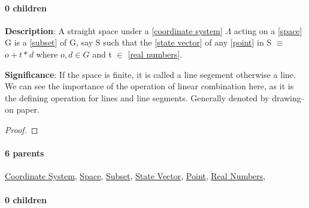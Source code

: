\documentclass[../main.tex]{subfiles}
\begin{document}
\paragraph{0 children} 



\begin{statement}
\label{statement:Straight Space}\hspace*{0pt}\par
\end{statement}
\textbf{Description}:
A straight space under a [\hyperref[statement:Coordinate System]{coordinate system}] $\Lambda$ acting on a [\hyperref[statement:Space]{space}] G is a [\hyperref[statement:Subset]{subset}] of G, say S such that the [\hyperref[statement:State Vector]{state vector}] of any [\hyperref[statement:Point]{point}] in S $ \equiv $ $ o + t * d $ where $ o, d \in G $ and t $ \in $ [\hyperref[statement:Real Numbers]{real numbers}].
\par
{\color{magenta} \textbf{Significance}:
If the space is finite, it is called a line segement otherwise a line.
We can see the importance of the operation of linear combination here, as it is the defining operation for lines and line segments.
Generally denoted by drawing $\overleftrightarrow{}$ on paper.
\par}
\begin{proof}
\proofbydefinition
\end{proof}\par
\paragraph{6 parents} \hyperref[statement:Coordinate System]{Coordinate System}, \hyperref[statement:Space]{Space}, \hyperref[statement:Subset]{Subset}, \hyperref[statement:State Vector]{State Vector}, \hyperref[statement:Point]{Point}, \hyperref[statement:Real Numbers]{Real Numbers}, 
\paragraph{0 children} 
\end{document}
